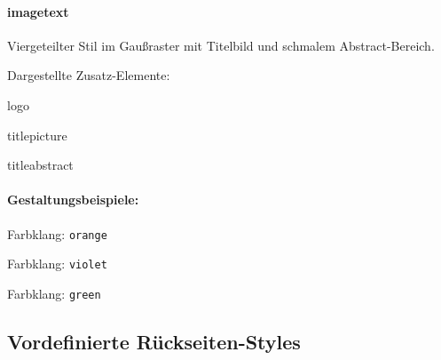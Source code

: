   \begin{minipage}[t]{0.33\textwidth}
    \null\centering\sffamily
  \end{minipage}
  \hfill
  \begin{minipage}[t]{0.6\textwidth}
    \paragraph{imagetext}
    
    Viergeteilter Stil im Gaußraster mit Titelbild und schmalem Abstract-Bereich.
    \par\bigskip
    \par\bigskip
    Dargestellte Zusatz-Elemente:
    \begin{compactitem}\ttfamily
      \item logo
      \item titlepicture
      \item titleabstract
    \end{compactitem}
  \end{minipage}

\paragraph{Gestaltungsbeispiele:}\hfill

\begin{minipage}{0.33\textwidth}\centering
  Farbklang: \texttt{orange}\\
\end{minipage}
\begin{minipage}{0.33\textwidth}\centering
  Farbklang: \texttt{violet}\\
\end{minipage}
\begin{minipage}{0.33\textwidth}\centering
  Farbklang: \texttt{green}\\
\end{minipage}

\subsection{Vordefinierte Rückseiten-Styles}\label{sec:backstyles}

